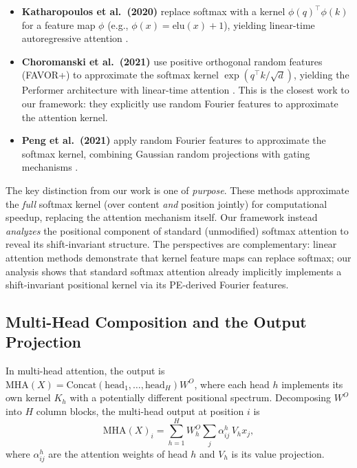 \documentclass[11pt]{article}
\theoremstyle{definition}
\begin{document}
\begin{itemize}
    \item \textbf{Katharopoulos et al.\ (2020)} replace softmax with a kernel $\phi(q)^\top \phi(k)$ for a feature map $\phi$ (e.g., $\phi(x) = \text{elu}(x) + 1$), yielding linear-time autoregressive attention \cite{katharopoulos2020linear}.
    \item \textbf{Choromanski et al.\ (2021)} use positive orthogonal random features (FAVOR+) to approximate the softmax kernel $\exp(q^\top k / \sqrt{d})$, yielding the Performer architecture with linear-time attention \cite{choromanski2021performers}. This is the closest work to our framework: they explicitly use random Fourier features to approximate the attention kernel.
    \item \textbf{Peng et al.\ (2021)} apply random Fourier features to approximate the softmax kernel, combining Gaussian random projections with gating mechanisms \cite{peng2021rfa}.
\end{itemize}

The key distinction from our work is one of \emph{purpose}. These methods approximate the \emph{full} softmax kernel (over content \emph{and} position jointly) for computational speedup, replacing the attention mechanism itself. Our framework instead \emph{analyzes} the positional component of standard (unmodified) softmax attention to reveal its shift-invariant structure. The perspectives are complementary: linear attention methods demonstrate that kernel feature maps can replace softmax; our analysis shows that standard softmax attention already implicitly implements a shift-invariant positional kernel via its PE-derived Fourier features.

\subsection{Multi-Head Composition and the Output Projection}

In multi-head attention, the output is $\text{MHA}(X) = \text{Concat}(\text{head}_1, \ldots, \text{head}_H) W^O$, where each head $h$ implements its own kernel $K_h$ with a potentially different positional spectrum. Decomposing $W^O$ into $H$ column blocks, the multi-head output at position $i$ is
\[
\text{MHA}(X)_i = \sum_{h=1}^{H} W^O_h \sum_j \alpha^h_{ij}\, V_h x_j,
\]
where $\alpha^h_{ij}$ are the attention weights of head $h$ and $V_h$ is its value projection.
\end{document}
